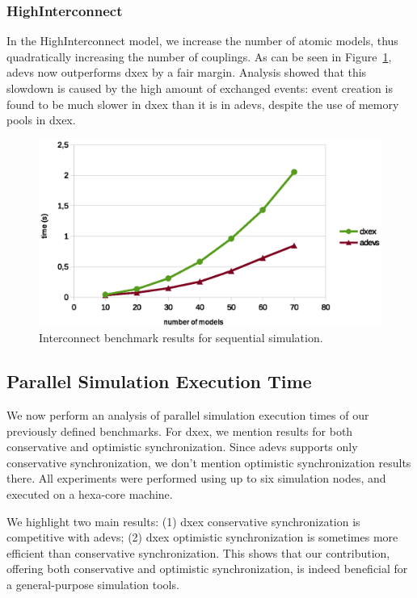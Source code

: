 \subsubsection{HighInterconnect}
In the HighInterconnect model, we increase the number of atomic models, thus quadratically increasing the number of couplings.
As can be seen in Figure~\ref{fig:Interconnect_benchmark}, adevs now outperforms dxex by a fair margin.
Analysis showed that this slowdown is caused by the high amount of exchanged events: event creation is found to be much slower in dxex than it is in adevs, despite the use of memory pools in dxex.

\begin{figure}
	\includegraphics[width=\columnwidth]{fig/interconnect_sequential.eps}
	\caption{Interconnect benchmark results for sequential simulation.}
	\label{fig:Interconnect_benchmark}
\end{figure}

\subsection{Parallel Simulation Execution Time}
We now perform an analysis of parallel simulation execution times of our previously defined benchmarks.
For dxex, we mention results for both conservative and optimistic synchronization.
Since adevs supports only conservative synchronization, we don't mention optimistic synchronization results there.
All experiments were performed using up to six simulation nodes, and executed on a hexa-core machine.

We highlight two main results:
(1) dxex conservative synchronization is competitive with adevs;
(2) dxex optimistic synchronization is sometimes more efficient than conservative synchronization.
This shows that our contribution, offering both conservative and optimistic synchronization, is indeed beneficial for a general-purpose simulation tools.

